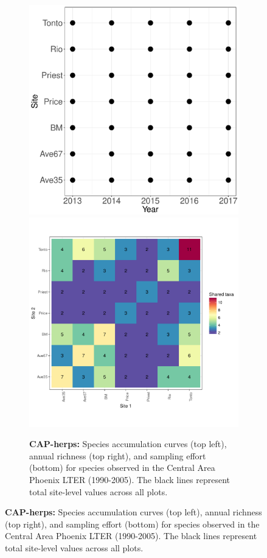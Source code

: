 \documentclass[11pt, oneside]{article}
\begin{document}
\begin{figure}[h!]
\begin{figure}[h!]
\includegraphics[scale = 0.4]{cap-herps-banville_spatiotemporal_sampling_effort.pdf}
\includegraphics[scale = 0.4]{cap-herps-banville_spp_shared.pdf}
\caption{{\bf CAP-herps:} Species accumulation curves (top left),  annual richness (top right), and sampling effort (bottom)  for species observed in the Central Area Phoenix LTER (1990-2005). The black lines represent total site-level values across all plots.}
\label{cap-herps}
\end{figure}




\end{figure}
\end{document}
